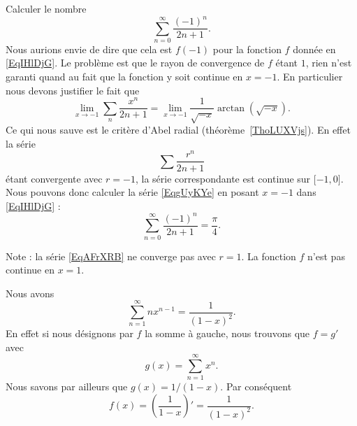 \begin{example}
	Calculer le nombre
	\begin{equation}        \label{EqgUyKYe}
		\sum_{n=0}^{\infty}\frac{ (-1)^n }{ 2n+1 }.
	\end{equation}
	Nous aurions envie de dire que cela est \( f(-1)\) pour la fonction \( f\) donnée en \eqref{EqIHlDjG}. Le problème est que le rayon de convergence de \( f\) étant \( 1\), rien n'est garanti quand au fait que la fonction y soit continue en \( x=-1\). En particulier nous devons justifier le fait que
	\begin{equation}
		\lim_{x\to -1} \sum_n\frac{ x^n }{ 2n+1 }=\lim_{x\to -1} \frac{1}{ \sqrt{-x} }\arctan(\sqrt{-x}).
	\end{equation}
	Ce qui nous sauve est le critère d'Abel radial (théorème~\ref{ThoLUXVjs}). En effet la série
	\begin{equation}        \label{EqAFrXRB}
		\sum\frac{ r^n }{ 2n+1 }
	\end{equation}
	étant convergente avec \( r=-1\), la série correspondante est continue sur \( \mathopen[ -1 , 0 \mathclose]\). Nous pouvons donc calculer la série \eqref{EqgUyKYe} en posant \( x=-1\) dans \eqref{EqIHlDjG} :
	\begin{equation}
		\sum_{n=0}^{\infty}\frac{ (-1)^n }{ 2n+1 }=\frac{ \pi }{ 4 }.
	\end{equation}

	Note : la série \eqref{EqAFrXRB} ne converge pas avec \( r=1\). La fonction \( f\) n'est pas continue en \( x=1\).
\end{example}

\begin{example}     \label{ExGxzLlP}
	Nous avons
	\begin{equation}
		\sum_{n=1}^{\infty}nx^{n-1}=\frac{1}{ (1-x)^2 }.
	\end{equation}
	En effet si nous désignons par \( f\) la somme à gauche, nous trouvons que \( f=g'\) avec
	\begin{equation}
		g(x)=\sum_{n=1}^{\infty}x^n.
	\end{equation}
	Nous savons par ailleurs que \( g(x)=1/(1-x)\). Par conséquent
	\begin{equation}
		f(x)=\left( \frac{1}{ 1-x } \right)'=\frac{1}{ (1-x)^2 }.
	\end{equation}
\end{example}

